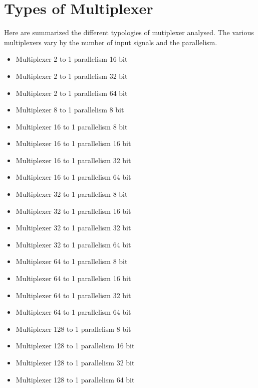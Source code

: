 \newpage
\section{Types of Multiplexer}
Here are summarized the different typologies of mutiplexer analysed. The various multiplexers vary by the number of input signals and the parallelism. 
\begin{itemize}\itemsep1pt
	\item Multiplexer 2 to 1 parallelism 16 bit
	\item Multiplexer 2 to 1 parallelism 32 bit
	\item Multiplexer 2 to 1 parallelism 64 bit 
	\item Multiplexer 8 to 1 parallelism 8 bit 	
	\item Multiplexer 16 to 1 parallelism 8 bit
	\item Multiplexer 16 to 1 parallelism 16 bit
	\item Multiplexer 16 to 1 parallelism 32 bit
	\item Multiplexer 16 to 1 parallelism 64 bit 
	\item Multiplexer 32 to 1 parallelism 8 bit
	\item Multiplexer 32 to 1 parallelism 16 bit
	\item Multiplexer 32 to 1 parallelism 32 bit
	\item Multiplexer 32 to 1 parallelism 64 bit 
	\item Multiplexer 64 to 1 parallelism 8 bit
	\item Multiplexer 64 to 1 parallelism 16 bit
	\item Multiplexer 64 to 1 parallelism 32 bit
	\item Multiplexer 64 to 1 parallelism 64 bit 
	\item Multiplexer 128 to 1 parallelism 8 bit
	\item Multiplexer 128 to 1 parallelism 16 bit
	\item Multiplexer 128 to 1 parallelism 32 bit
	\item Multiplexer 128 to 1 parallelism 64 bit 
\end{itemize}
